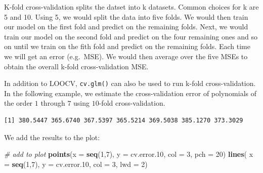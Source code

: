 \documentclass[]{article}
\newenvironment{Shaded}{\begin{snugshade}}{\end{snugshade}}
\newcommand{\CommentTok}[1]{\textcolor[rgb]{0.56,0.35,0.01}{\textit{#1}}}
\newcommand{\ControlFlowTok}[1]{\textcolor[rgb]{0.13,0.29,0.53}{\textbf{#1}}}
\newcommand{\DataTypeTok}[1]{\textcolor[rgb]{0.13,0.29,0.53}{#1}}
\newcommand{\DecValTok}[1]{\textcolor[rgb]{0.00,0.00,0.81}{#1}}
\newcommand{\FloatTok}[1]{\textcolor[rgb]{0.00,0.00,0.81}{#1}}
\newcommand{\KeywordTok}[1]{\textcolor[rgb]{0.13,0.29,0.53}{\textbf{#1}}}
\newcommand{\NormalTok}[1]{#1}
\newcommand{\OperatorTok}[1]{\textcolor[rgb]{0.81,0.36,0.00}{\textbf{#1}}}
\newcommand{\OtherTok}[1]{\textcolor[rgb]{0.56,0.35,0.01}{#1}}
\newcommand{\StringTok}[1]{\textcolor[rgb]{0.31,0.60,0.02}{#1}}
\begin{document}
K-fold cross-validation splits the datset into k datasets. Common choices for k are 5 and 10. Using 5, we would split the data into five folds. We would then train our model on the first fold and predict on the remaining folds. Next, we would train our model on the second fold and predict on the four remaining ones and so on until we train on the fith fold and predict on the remaining folds. Each time we will get an error (e.g.~MSE). We would then average over the five MSEs to obtain the overall k-fold cross-validation MSE.

In addition to LOOCV, \texttt{cv.glm()} can also be used to run k-fold cross-validation. In the following example, we estimate the cross-validation error of polynomials of the order \(1\) through \(7\) using \(10\)-fold cross-validation.

\begin{Shaded}
\end{Shaded}

\begin{verbatim}
[1] 380.5447 365.6740 367.5397 365.5214 369.5038 385.1270 373.3029
\end{verbatim}

We add the results to the plot:

\begin{Shaded}
\begin{Highlighting}[]
\CommentTok{# add to plot}
\KeywordTok{points}\NormalTok{(}\DataTypeTok{x =} \KeywordTok{seq}\NormalTok{(}\DecValTok{1}\NormalTok{,}\DecValTok{7}\NormalTok{), }\DataTypeTok{y =}\NormalTok{ cv.error}\FloatTok{.10}\NormalTok{, }\DataTypeTok{col =} \DecValTok{3}\NormalTok{, }\DataTypeTok{pch =} \DecValTok{20}\NormalTok{)}
\KeywordTok{lines}\NormalTok{( }\DataTypeTok{x =} \KeywordTok{seq}\NormalTok{(}\DecValTok{1}\NormalTok{,}\DecValTok{7}\NormalTok{), }\DataTypeTok{y =}\NormalTok{ cv.error}\FloatTok{.10}\NormalTok{, }\DataTypeTok{col =} \DecValTok{3}\NormalTok{, }\DataTypeTok{lwd =} \DecValTok{2}\NormalTok{)}
\end{Highlighting}
\end{Shaded}
\end{document}
